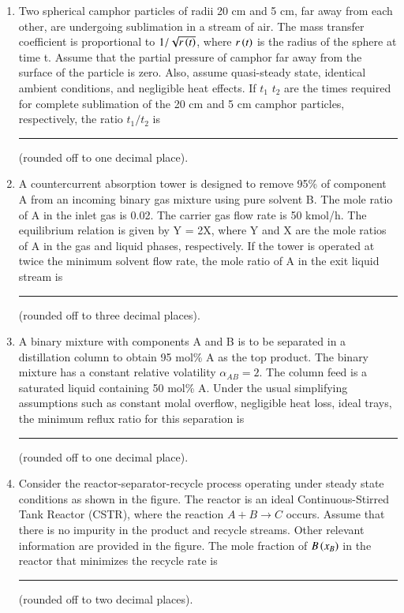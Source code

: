 \documentclass[journal,12pt,onecolumn]{IEEEtran}
\theoremstyle{remark}
\begin{document}
\begin{enumerate}
    \item Two spherical camphor particles of radii 20 cm and 5 cm, far away from each other, are undergoing sublimation in a stream of air. The mass transfer coefficient is proportional to $1/\sqrt{r\left(t\right)}$, where $r\left(t\right)$ is the radius of the sphere at time t. Assume that the partial pressure of camphor far away from the surface of the particle is zero. Also, assume quasi-steady state, identical ambient conditions, and negligible heat effects. If $t_1$ $t_2$ are the times required for complete sublimation of the 20 cm and 5 cm camphor particles, respectively, the ratio $t_1/ t_2$ is \rule{2cm}{0.1mm}(rounded off to one decimal place). 
    
\hfill{}
    \item A countercurrent absorption tower is designed to remove 95\% of component A from an incoming binary gas mixture using pure solvent B. The mole ratio of A in the inlet gas is 0.02. The carrier gas flow rate is 50 kmol/h. The equilibrium relation is given by Y = 2X, where Y and X are the mole ratios of A in the gas and liquid phases, respectively. If the tower is operated at twice the minimum solvent flow rate, the mole ratio of A in the exit liquid stream is \rule{2cm}{0.1mm} (rounded off to three decimal places). 
    
\hfill{}
    \item A binary mixture with components A and B is to be separated in a distillation column to obtain 95 mol\% A as the top product. The binary mixture has a constant relative volatility $\alpha_{AB} = 2$. The column feed is a saturated liquid containing 50 mol\% A. Under the usual simplifying assumptions such as constant molal overflow, negligible heat loss, ideal trays, the minimum reflux ratio for this separation is \rule{2cm}{0.1mm}(rounded off to one decimal place).
    
\hfill{}
\newpage
    \item Consider the reactor-separator-recycle process operating under steady state conditions as shown in the figure. The reactor is an ideal Continuous-Stirred Tank Reactor (CSTR), where the reaction $A + B \to C$ occurs. Assume that there is no impurity in the product and recycle streams. Other relevant information are provided in the figure. The mole fraction of $B\left(x_{B}\right)$ in the reactor that minimizes the recycle rate is \rule{2cm}{0.1mm}(rounded off to two decimal places). 
    

\end{enumerate}
\end{document}
